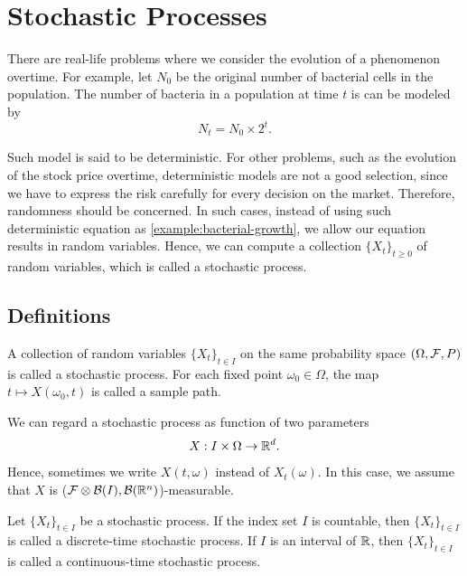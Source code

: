 \section{Stochastic Processes}
\label{subsection:stochastic-processes}
There are real-life problems where we consider the evolution of a phenomenon overtime. For example, let $N_0$ be the original number of bacterial cells in the population. The number of bacteria in a population at time $t$ is can be modeled by
\begin{equation}
  \label{example:bacterial-growth}
  N_t = N_0\times 2^t.
\end{equation}

Such model is said to be deterministic. For other problems, such as the evolution of the stock price overtime, deterministic models are not a good selection, since we have to express the risk carefully for every decision on the market. Therefore, randomness should be concerned. In such cases, instead of using such deterministic equation as \ref{example:bacterial-growth}, we allow our equation results in random variables. Hence, we can compute a collection $\{X_t\}_{t\ge0}$ of random variables, which is called a stochastic process.

\subsection{Definitions}

\begin{definition}
  \label{definition:stochastic-process}
  A collection of random variables $\{X_t\}_{t\in I}$ on the same probability space $(\Omega,\mathcal{F}, P)$ is called a stochastic process. For each fixed point $\omega_0\in\Omega$, the map $t\mapsto X(\omega_0, t)$ is called a sample path.
\end{definition}

\begin{remark}
  We can regard a stochastic process as function of two parameters
  $$X:I\times\Omega \to \mathbb{R}^d.$$
  Hence, sometimes we write $X(t,\omega)$ instead of $X_t(\omega)$. In this case, we assume that $X$ is ($\mathcal{F}\otimes\mathcal{B}(I),\mathcal{B}(\mathbb{R}^n)$)-measurable.
\end{remark}

\begin{definition}
  Let $\{X_t\}_{t\in I}$ be a stochastic process. If the index set $I$ is countable, then $\{X_t\}_{t\in I}$ is called a discrete-time stochastic process. If $I$ is an interval of $\mathbb{R}$, then $\{X_t\}_{t\in I}$ is called a continuous-time stochastic process.
\end{definition}

